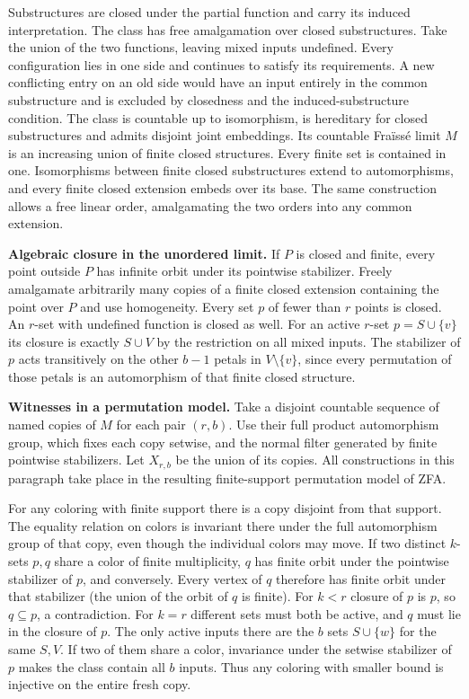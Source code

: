 \documentclass[11pt]{article}
\begin{document}
Substructures are closed under the partial function and carry its induced interpretation. The class has free amalgamation over closed substructures. Take the union of the two functions, leaving mixed inputs undefined. Every configuration lies in one side and continues to satisfy its requirements. A new conflicting entry on an old side would have an input entirely in the common substructure and is excluded by closedness and the induced-substructure condition. The class is countable up to isomorphism, is hereditary for closed substructures and admits disjoint joint embeddings. Its countable Fraïssé limit \(M\) is an increasing union of finite closed structures. Every finite set is contained in one. Isomorphisms between finite closed substructures extend to automorphisms, and every finite closed extension embeds over its base. The same construction allows a free linear order, amalgamating the two orders into any common extension.

\textbf{Algebraic closure in the unordered limit.} If \(P\) is closed and finite, every point outside \(P\) has infinite orbit under its pointwise stabilizer. Freely amalgamate arbitrarily many copies of a finite closed extension containing the point over \(P\) and use homogeneity. Every set \(p\) of fewer than \(r\) points is closed. An \(r\)-set with undefined function is closed as well. For an active \(r\)-set \(p=S\cup\{v\}\) its closure is exactly \(S\cup V\) by the restriction on all mixed inputs. The stabilizer of \(p\) acts transitively on the other \(b-1\) petals in \(V\setminus\{v\}\), since every permutation of those petals is an automorphism of that finite closed structure.

\textbf{Witnesses in a permutation model.} Take a disjoint countable sequence of named copies of \(M\) for each pair \((r,b)\). Use their full product automorphism group, which fixes each copy setwise, and the normal filter generated by finite pointwise stabilizers. Let \(X_{r,b}\) be the union of its copies. All constructions in this paragraph take place in the resulting finite-support permutation model of ZFA.

For any coloring with finite support there is a copy disjoint from that support. The equality relation on colors is invariant there under the full automorphism group of that copy, even though the individual colors may move. If two distinct \(k\)-sets \(p,q\) share a color of finite multiplicity, \(q\) has finite orbit under the pointwise stabilizer of \(p\), and conversely. Every vertex of \(q\) therefore has finite orbit under that stabilizer (the union of the orbit of \(q\) is finite). For \(k<r\) closure of \(p\) is \(p\), so \(q\subseteq p\), a contradiction. For \(k=r\) different sets must both be active, and \(q\) must lie in the closure of \(p\). The only active inputs there are the \(b\) sets \(S\cup\{w\}\) for the same \(S,V\). If two of them share a color, invariance under the setwise stabilizer of \(p\) makes the class contain all \(b\) inputs. Thus any coloring with smaller bound is injective on the entire fresh copy.
\end{document}
